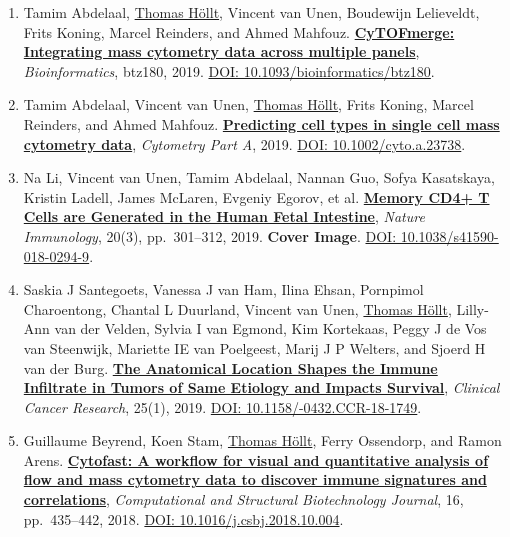 \documentclass[10pt,a4paper,roman,final]{moderncv}
\newcommand*\highlightauthor[1]{\underline{#1}}
\begin{document}
\begin{enumerate}[leftmargin=0cm,start=2]
\item
Tamim Abdelaal, \highlightauthor{Thomas Höllt}, Vincent van Unen, Boudewijn Lelieveldt, Frits Koning, Marcel Reinders, and Ahmed Mahfouz.
\href{https://www.thomashollt.com/publications/2019_cytofmerge/}{\textbf{CyTOFmerge: Integrating mass cytometry data across multiple panels}},
\emph{Bioinformatics}, btz180,
2019.
\href{https://doi.org/10.1093/bioinformatics/btz180}{DOI: 10.1093/\allowbreak bioinformatics/\allowbreak btz180}.


\item
Tamim Abdelaal, Vincent van Unen, \highlightauthor{Thomas Höllt}, Frits Koning, Marcel Reinders, and Ahmed Mahfouz.
\href{https://www.thomashollt.com/publications/2019_cytofclass/}{\textbf{Predicting cell types in single cell mass cytometry data}},
\emph{Cytometry Part A},
2019.
\href{https://doi.org/10.1002/cyto.a.23738}{DOI: 10.1002/\allowbreak cyto.a.23738}.


\item
Na Li, Vincent van Unen, Tamim Abdelaal, Nannan Guo, Sofya Kasatskaya, Kristin Ladell, James McLaren, Evgeniy Egorov, et al.
\href{https://www.thomashollt.com/publications/2019_nature_immunology/}{\textbf{Memory CD4+ T Cells are Generated in the Human Fetal Intestine}},
\emph{Nature Immunology}, 20(3), pp.~301--312,
2019.
\textbf{Cover Image}.
\href{https://doi.org/10.1038/s41590-018-0294-9}{DOI: 10.1038/\allowbreak s41590-018-0294-9}.


\item
Saskia J Santegoets, Vanessa J van Ham, Ilina Ehsan, Pornpimol Charoentong, Chantal L Duurland, Vincent van Unen, \highlightauthor{Thomas Höllt}, Lilly-Ann van der Velden, Sylvia I van Egmond, Kim Kortekaas, Peggy J de Vos van Steenwijk, Mariette IE van Poelgeest, Marij J P Welters, and Sjoerd H van der Burg.
\href{https://www.thomashollt.com/publications/2018_clinical_cancer_research/}{\textbf{The Anatomical Location Shapes the Immune Infiltrate in Tumors of Same Etiology and Impacts Survival}},
\emph{Clinical Cancer Research}, 25(1),
2019.
\href{https://doi.org/10.1158/1078-0432.CCR-18-1749}{DOI: 10.1158/-0432.CCR-18-1749}.


\item
Guillaume Beyrend, Koen Stam, \highlightauthor{Thomas Höllt}, Ferry Ossendorp, and Ramon Arens.
\href{https://www.thomashollt.com/publications/2018_cytofast/}{\textbf{Cytofast: A workflow for visual and quantitative analysis of flow and mass cytometry data to discover immune signatures and correlations}},
\emph{Computational and Structural Biotechnology Journal}, 16, pp.~435--442,
2018.
\href{https://doi.org/10.1016/j.csbj.2018.10.004}{DOI: 10.1016/\allowbreak j.csbj.2018.10.004}.



\end{enumerate}
\end{document}
